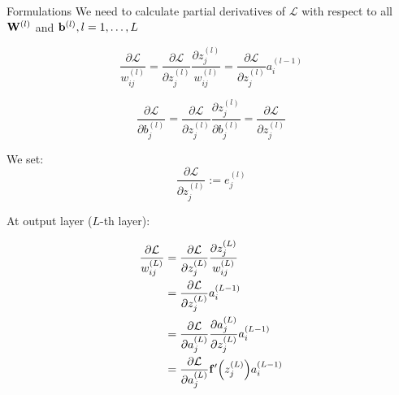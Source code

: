 \documentclass[10pt]{beamer}
\theoremstyle{remark}
\theoremstyle{definition}
\begin{document}
\begin{frame}[allowframebreaks]{Formulations}
	We need to calculate partial derivatives of $\mathcal{L}$ with respect to all $\bold{W}^{(l)}$ and $\bold{b}^{(l)}, l=1, \dots, L$

	\begin{equation}
		\dfrac{\partial \mathcal{L}}{w_{ij}^{(l)}}=\dfrac{\partial \mathcal{L}}{\partial z_{j}^{(l)}}\dfrac{\partial z_j^{(l)}}{w_{ij}^{(l)}}=\dfrac{\partial \mathcal{L}}{\partial z_{j}^{(l)}}a_i^{(l-1)}
	\end{equation}

	\begin{equation}
		\dfrac{\partial \mathcal{L}}{\partial b_j^{(l)}}=\dfrac{\partial \mathcal{L}}{\partial z_{j}^{(l)}}\dfrac{\partial z_j^{(l)}}{\partial b_j^{(l)}}=\dfrac{\partial \mathcal{L}}{\partial z_{j}^{(l)}}
	\end{equation}

	We set:
	\begin{equation}
		\dfrac{\partial \mathcal{L}}{\partial z_{j}^{(l)}}:=e_j^{(l)}
	\end{equation}

	At output layer ($L$-th layer):

	\begin{equation}
		\begin{aligned}
			\dfrac{\partial \mathcal{L}}{w_{ij}^{(L)}}&=\dfrac{\partial \mathcal{L}}{\partial z_{j}^{(L)}}\dfrac{\partial z_j^{(L)}}{w_{ij}^{(L)}}\\&=\dfrac{\partial \mathcal{L}}{\partial z_{j}^{(L)}}a_i^{(L-1)}\\&=\dfrac{\partial\mathcal{L}}{\partial a_j^{(L)}}\dfrac{\partial a_j^{(L)}}{\partial z_j^{(L)}}a_i^{(L-1)}\\&=\dfrac{\partial\mathcal{L}}{\partial a_j^{(L)}}\bold{f}^{\prime}\Big(z_j^{(L)}\Big)a_i^{(L-1)}
		\end{aligned}
	\end{equation}


\end{frame}
\end{document}
